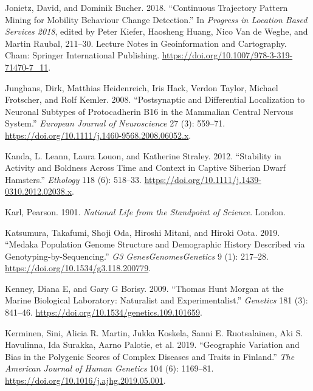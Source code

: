 \documentclass[
]{book}
\newlength{\cslhangindent}
\newlength{\cslentryspacingunit} %
\newenvironment{CSLReferences}[2] %
 {%
  \setlength{\parindent}{0pt}
  \ifodd #1
  \let\oldpar\par
  \def\par{\hangindent=\cslhangindent\oldpar}
  \fi
  \setlength{\parskip}{#2\cslentryspacingunit}
 }%
 {}
\begin{document}
\begin{CSLReferences}{1}{0}
\leavevmode{}%
Jonietz, David, and Dominik Bucher. 2018. {``Continuous {Trajectory Pattern Mining} for {Mobility Behaviour Change Detection}.''} In \emph{Progress in {Location Based Services} 2018}, edited by Peter Kiefer, Haosheng Huang, Nico Van de Weghe, and Martin Raubal, 211--30. Lecture {Notes} in {Geoinformation} and {Cartography}. {Cham}: {Springer International Publishing}. \url{https://doi.org/10.1007/978-3-319-71470-7_11}.

\leavevmode{}%
Junghans, Dirk, Matthias Heidenreich, Iris Hack, Verdon Taylor, Michael Frotscher, and Rolf Kemler. 2008. {``Postsynaptic and Differential Localization to Neuronal Subtypes of Protocadherin Β16 in the Mammalian Central Nervous System.''} \emph{European Journal of Neuroscience} 27 (3): 559--71. \url{https://doi.org/10.1111/j.1460-9568.2008.06052.x}.

\leavevmode{}%
Kanda, L. Leann, Laura Louon, and Katherine Straley. 2012. {``Stability in {Activity} and {Boldness Across Time} and {Context} in {Captive Siberian Dwarf Hamsters}.''} \emph{Ethology} 118 (6): 518--33. \url{https://doi.org/10.1111/j.1439-0310.2012.02038.x}.

\leavevmode{}%
Karl, Pearson. 1901. \emph{National {Life} from the Standpoint of {Science}}. {London}.

\leavevmode{}%
Katsumura, Takafumi, Shoji Oda, Hiroshi Mitani, and Hiroki Oota. 2019. {``Medaka {Population Genome Structure} and {Demographic History Described} via {Genotyping-by-Sequencing}.''} \emph{G3 Genes\textbar Genomes\textbar Genetics} 9 (1): 217--28. \url{https://doi.org/10.1534/g3.118.200779}.

\leavevmode{}%
Kenney, Diana E, and Gary G Borisy. 2009. {``Thomas {Hunt Morgan} at the {Marine Biological Laboratory}: {Naturalist} and {Experimentalist}.''} \emph{Genetics} 181 (3): 841--46. \url{https://doi.org/10.1534/genetics.109.101659}.

\leavevmode{}%
Kerminen, Sini, Alicia R. Martin, Jukka Koskela, Sanni E. Ruotsalainen, Aki S. Havulinna, Ida Surakka, Aarno Palotie, et al. 2019. {``Geographic {Variation} and {Bias} in the {Polygenic Scores} of {Complex Diseases} and {Traits} in {Finland}.''} \emph{The American Journal of Human Genetics} 104 (6): 1169--81. \url{https://doi.org/10.1016/j.ajhg.2019.05.001}.


\end{CSLReferences}
\end{document}
